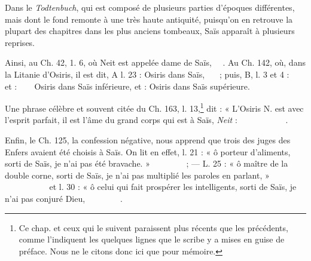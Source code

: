 \documentclass[a4paper, 11pt, oneside]{article}
\newcommand*\hieroAAAD{}
\newcommand*\hieroAAAF{}
\newcommand*\hieroAAAG{}
\newcommand*\hieroAAAH{}
\newcommand*\hieroAAAI{}
\newcommand*\hieroAAAQ{}
\newcommand*\hieroAAAW{\raisebox{0.5ex}{}}
\newcommand*\hieroAABC{\raisebox{0.5ex}{}}
\newcommand*\hieroAABR{}
\newcommand*\hieroAACJ{}
\newcommand*\hieroAACM{}
\newcommand*\hieroAACN{\raisebox{1ex}{}}
\newcommand*\hieroAACR{}
\newcommand*\hieroAACV{}
\newcommand*\hieroAACW{}
\newcommand*\hieroAACX{}
\newcommand*\hieroAACY{}
\newcommand*\hieroAACZ{}
\newcommand*\hieroAADA{}
\newcommand*\hieroAADB{}
\newcommand*\hieroAADC{\raisebox{0.5ex}{}}
\newcommand*\hieroAADD{}
\newcommand*\hieroAADE{}
\newcommand*\hieroAADF{}
\newcommand*\hieroAADG{}
\newcommand*\hieroAADH{}
\newcommand*\hieroAADI{\raisebox{0.5ex}{}}
\newcommand*\hieroAADJ{}
\newcommand*\hieroAADK{}
\newcommand*\hieroAADL{}
\newcommand*\hieroAADM{}
\newcommand*\hieroAADN{}
\newcommand*\hieroAADO{}
\newcommand*\hieroAADP{}
\newcommand*\hieroAADQ{}
\newcommand*\hieroAADR{}
\newcommand*\hieroAADS{}
\newcommand*\hieroAADT{}
\newcommand*\hieroAADU{}
\newcommand*\hieroAADV{\raisebox{0.5ex}{}}
\newcommand*\hieroAADW{}
\newcommand*\hieroAADX{}
\newcommand*\hieroAADY{\raisebox{0.3ex}{}}
\newcommand*\hieroAADZ{}
\newcommand*\hieroAAEA{}
\newcommand*\hieroAAEB{}
\newcommand*\hieroAAEC{}
\newcommand*\hieroAAED{}
\newcommand*\hieroAAEE{}
\newcommand*\hieroAAEF{}
\newcommand*\hieroAAEG{}
\newcommand*\hieroAAEH{}
\newcommand*\hieroAAEI{}
\newcommand*\hieroAAEJ{}
\newcommand*\hieroAAEK{}
\begin{document}
Dans le \emph{Todtenbuch}, qui est composé de plusieurs parties d'époques différentes, mais dont le fond remonte à une très haute antiquité, puisqu'on en retrouve la plupart des chapitres dans les plus anciens tombeaux, Saïs apparaît à plusieurs reprises.

Ainsi, au Ch. 42, 1. 6, où Neit est appelée dame de Saïs, $\hieroAACV\:\hieroAABC\:\hieroAACW\:\hieroAACX\:\hieroAACY$. Au Ch. 142, où, dans la Litanie d'Osiris, il est dit, A l. 23 : Osiris dans Saïs, $\hieroAACZ\:\hieroAADA\:\hieroAAAI\allowbreak\:\hieroAAAG\:\hieroAAAF\:\hieroAADB$ ; puis, B, l. 3 et 4 : $\hieroAACZ\:\hieroAADA\:\hieroAAAI\allowbreak\:\hieroAADC\:\hieroAAAW\:\hieroAADD\:\hieroAADB$ et : $\hieroAACZ\:\hieroAABR\:\hieroAAAD\:\hieroAADC\:\hieroAAAW\:\hieroAADE\:\hieroAADB$ Osiris dans Saïs inférieure, et : Osiris dans Saïs supérieure.

Une phrase célèbre et souvent citée du Ch. 163, l. 13,\footnote{Ce chap. et ceux qui le suivent paraissent plus récents que les précédents, comme l'indiquent les quelques lignes que le scribe y a mises en guise de préface. Nous ne le citons donc ici que pour mémoire.} dit : « L'Osiris N. est avec l'esprit parfait, il est l'âme du grand corps qui est à Saïs, \emph{Neit} : $\hieroAAAH\:\hieroAADF\:\hieroAACR\:\hieroAADG\allowbreak\:\hieroAADH\:\hieroAADI\:\hieroAADB\:\hieroAAAH\allowbreak\:\hieroAADJ\:\hieroAADK\:\hieroAADL\:\hieroAADM\allowbreak\:\hieroAADN\:\hieroAACN\:\hieroAADO\allowbreak\:\hieroAADP\:\hieroAADQ\:\hieroAADR\:\hieroAABR\allowbreak\:\hieroAAAD\:\hieroAAAG\:\hieroAADC\:\hieroAAAW\allowbreak\:\hieroAAAQ\:\hieroAACY$.

Enfin, le Ch. 125, la confession négative, nous apprend que trois des juges des Enfers avaient été choisis à Saïs. On lit en effet, l. 21 : « ô porteur d'aliments, sorti de Saïs, je n'ai pas été bravache. » $\hieroAAAH\:\hieroAADF\:\hieroAACJ\:\hieroAACN\allowbreak\:\hieroAADS\:\hieroAADT\:\hieroAADU\:\hieroAADV\allowbreak\:\hieroAAAD\:\hieroAAAG\:\hieroAADC\:\hieroAAAW\allowbreak\:\hieroAADB\:\hieroAADW\:\hieroAADU\allowbreak\:\hieroAADX\:\hieroAADF$ ; --- L. 25 : « ô maître de la double corne, sorti de Saïs, je n'ai pas multiplié les paroles en parlant, » $\hieroAAAH\:\hieroAADF\:\hieroAABC\allowbreak\:\hieroAADY\:\hieroAADY\:\hieroAADU\allowbreak\:\hieroAADV\:\hieroAAAD\:\hieroAAAG\allowbreak\:\hieroAADC\:\hieroAAAW\:\hieroAADB\allowbreak\:\hieroAADW\:\hieroAADZ\:\hieroAAEA\allowbreak\:\hieroAACM\:\hieroAADF\:\hieroAAEB\allowbreak\:\hieroAAEC\:\hieroAAED\:\hieroAAEE\allowbreak\:\hieroAADF\:\hieroAAEF$ et l. 30 : « ô celui qui fait prospérer les intelligents, sorti de Saïs, je n'ai pas conjuré Dieu, $\hieroAAAH\:\hieroAADF\:\hieroAAEG\allowbreak\:\hieroAAEH\:\hieroAAEI\:\hieroAADU\allowbreak\:\hieroAADV\:\hieroAAAD\:\hieroAAAG\allowbreak\:\hieroAADC\:\hieroAAAW\:\hieroAADB\allowbreak\:\hieroAADW\:\hieroAAEJ\:\hieroAADF\allowbreak\:\hieroAAEB\:\hieroAAEK\:\hieroAADB$.
\end{document}
